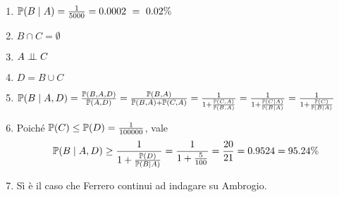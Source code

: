 \begin{enumerate}
\item $\mathbb{P}( B\mid A) =\frac{1}{5000} =0.0002\ =\ 0.02\%$
\item $B\cap C=\emptyset $
\item $A\perp \!\!\! \perp C$
\item $D=B\cup C$
\item $\mathbb{P}( B\mid A,D) =\frac{\mathbb{P}( B,A,D)}{\mathbb{P}( A,D)} =\frac{\mathbb{P}( B,A)}{\mathbb{P}( B,A) +\mathbb{P}( C,A)} =\frac{1}{1+\frac{\mathbb{P}( C,A)}{\mathbb{P}( B,A)}} =\frac{1}{1+\frac{\mathbb{P}( C\mid A)}{\mathbb{P}( B\mid A)}} =\frac{1}{1+\frac{\mathbb{P}( C)}{\mathbb{P}( B\mid A)}}$
\item Poiché $\mathbb{P}( C) \leq \mathbb{P}( D) =\frac{1}{100000}$, vale
\begin{equation*}
\mathbb{P}( B\mid A,D) \geq \frac{1}{1+\frac{\mathbb{P}( D)}{\mathbb{P}( B\mid A)}} =\frac{1}{1+\frac{5}{100}} =\frac{20}{21} =0.9524=95.24\%
\end{equation*}
\item Sì è il caso che Ferrero continui ad indagare su Ambrogio.
\end{enumerate}
\Soluzione

